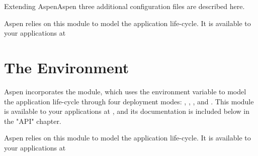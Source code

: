 \begin{seealso}

{Extending Aspen}{Aspen three additional configuration files are described
here.}

{}{Aspen relies on this module to model the application life-cycle.
It is available to your applications at }

\end{seealso}


\section{The Environment \label{environment}}

Aspen incorporates the  module, which uses the 
environment variable to model the application life-cycle through four deployment
modes: , , , and
. This module is available to your applications at
, and its documentation is included below in the "API"
chapter.


\begin{seealso}

{}{Aspen relies on this module to model the application life-cycle.
It is available to your applications at }

\end{seealso}
